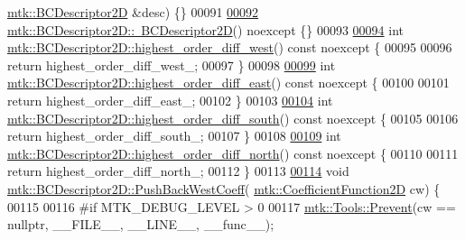 \begin{DoxyCode}
      \hyperlink{classmtk_1_1BCDescriptor2D}{mtk::BCDescriptor2D} &desc) \{\}
00091 
\hypertarget{mtk__bc__descriptor__2d_8cc_source_l00092}{}\hyperlink{classmtk_1_1BCDescriptor2D_ae14e62548a8bc080d576fff6937c546b}{00092} \hyperlink{classmtk_1_1BCDescriptor2D_ae14e62548a8bc080d576fff6937c546b}{mtk::BCDescriptor2D::~BCDescriptor2D}() noexcept \{\}
00093 
\hypertarget{mtk__bc__descriptor__2d_8cc_source_l00094}{}\hyperlink{classmtk_1_1BCDescriptor2D_a0fa469ddf6ff76e2858d6d3b76cc8b6f}{00094} \textcolor{keywordtype}{int} \hyperlink{classmtk_1_1BCDescriptor2D_a0fa469ddf6ff76e2858d6d3b76cc8b6f}{mtk::BCDescriptor2D::highest\_order\_diff\_west}() const 
      noexcept \{
00095 
00096   \textcolor{keywordflow}{return} highest\_order\_diff\_west\_;
00097 \}
00098 
\hypertarget{mtk__bc__descriptor__2d_8cc_source_l00099}{}\hyperlink{classmtk_1_1BCDescriptor2D_a5a9b80a2e9e579b05d9f3589d80448b6}{00099} \textcolor{keywordtype}{int} \hyperlink{classmtk_1_1BCDescriptor2D_a5a9b80a2e9e579b05d9f3589d80448b6}{mtk::BCDescriptor2D::highest\_order\_diff\_east}() const 
      noexcept \{
00100 
00101   \textcolor{keywordflow}{return} highest\_order\_diff\_east\_;
00102 \}
00103 
\hypertarget{mtk__bc__descriptor__2d_8cc_source_l00104}{}\hyperlink{classmtk_1_1BCDescriptor2D_a463d909f6014e7f01b33171a06d7b400}{00104} \textcolor{keywordtype}{int} \hyperlink{classmtk_1_1BCDescriptor2D_a463d909f6014e7f01b33171a06d7b400}{mtk::BCDescriptor2D::highest\_order\_diff\_south}() const 
      noexcept \{
00105 
00106   \textcolor{keywordflow}{return} highest\_order\_diff\_south\_;
00107 \}
00108 
\hypertarget{mtk__bc__descriptor__2d_8cc_source_l00109}{}\hyperlink{classmtk_1_1BCDescriptor2D_a87c5f2449247d65ea07784ba2ec61bc7}{00109} \textcolor{keywordtype}{int} \hyperlink{classmtk_1_1BCDescriptor2D_a87c5f2449247d65ea07784ba2ec61bc7}{mtk::BCDescriptor2D::highest\_order\_diff\_north}() const 
      noexcept \{
00110 
00111   \textcolor{keywordflow}{return} highest\_order\_diff\_north\_;
00112 \}
00113 
\hypertarget{mtk__bc__descriptor__2d_8cc_source_l00114}{}\hyperlink{classmtk_1_1BCDescriptor2D_a3da32ba89cfb15032bb1156394bad98c}{00114} \textcolor{keywordtype}{void} \hyperlink{classmtk_1_1BCDescriptor2D_a3da32ba89cfb15032bb1156394bad98c}{mtk::BCDescriptor2D::PushBackWestCoeff}(
      \hyperlink{group__c07-mim__ops_gad9e1c0ace886b0029aefffa5f320e852}{mtk::CoefficientFunction2D} cw) \{
00115 
00116 \textcolor{preprocessor}{  #if MTK\_DEBUG\_LEVEL > 0}
00117   \hyperlink{classmtk_1_1Tools_a332324c6f25e66be9dff48c5987a3b9f}{mtk::Tools::Prevent}(cw == \textcolor{keyword}{nullptr}, \_\_FILE\_\_, \_\_LINE\_\_, \_\_func\_\_);

\end{DoxyCode}
